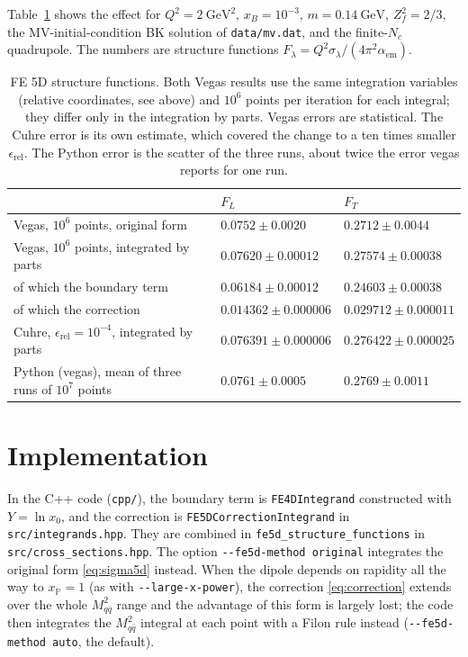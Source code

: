 \documentclass[11pt,a4paper]{article}
\newcommand{\Mqq}{M_{q\bar q}^2}
\newcommand{\xP}{x_{\mathbb{P}}}
\begin{document}
Table~\ref{tab:numbers} shows the effect for $Q^2 = 2\ \text{GeV}^2$,
$x_B = 10^{-3}$, $m = 0.14\ \text{GeV}$, $Z_f^2 = 2/3$, the MV-initial-condition
BK solution of \texttt{data/mv.dat}, and the finite-$N_c$ quadrupole. The
numbers are structure functions $F_\lambda = Q^2 \sigma_\lambda/(4\pi^2
\alpha_{\text{em}})$.
\begin{table}[h]
  \centering
  \small
  \begin{tabular}{lll}
    \toprule
    & $F_L$ & $F_T$ \\
    \midrule
    Vegas, $10^6$ points, original form          & $0.0752 \pm 0.0020$ & $0.2712 \pm 0.0044$ \\
    Vegas, $10^6$ points, integrated by parts    & $0.07620 \pm 0.00012$ & $0.27574 \pm 0.00038$ \\
    \quad of which the boundary term            & $0.06184 \pm 0.00012$ & $0.24603 \pm 0.00038$ \\
    \quad of which the correction               & $0.014362 \pm 0.000006$ & $0.029712 \pm 0.000011$ \\
    Cuhre, $\epsilon_{\text{rel}} = 10^{-4}$, integrated by parts & $0.076391 \pm 0.000006$ & $0.276422 \pm 0.000025$ \\
    Python (vegas), mean of three runs of $10^7$ points & $0.0761 \pm 0.0005$ & $0.2769 \pm 0.0011$ \\
    \bottomrule
  \end{tabular}
  \caption{FE 5D structure functions. Both Vegas results use the same
    integration variables (relative coordinates, see above) and $10^6$ points
    per iteration for each integral; they differ only in the integration by
    parts. Vegas errors are statistical. The Cuhre
    error is its own estimate, which covered the change to a ten times smaller
    $\epsilon_{\text{rel}}$. The Python error is the scatter of the three runs,
    about twice the error vegas reports for one run.}
  \label{tab:numbers}
\end{table}

\section{Implementation}

In the C++ code (\texttt{cpp/}), the boundary term is \texttt{FE4DIntegrand}
constructed with $Y = \ln x_0$, and the correction is
\texttt{FE5DCorrectionIntegrand} in \texttt{src/integrands.hpp}. They are
combined in \texttt{fe5d\_structure\_functions} in
\texttt{src/cross\_sections.hpp}. The option \texttt{-{}-fe5d-method original}
integrates the original form \eqref{eq:sigma5d} instead. When the dipole depends
on rapidity all the way to $\xP = 1$ (as with \texttt{-{}-large-x-power}), the
correction \eqref{eq:correction} extends over the whole $\Mqq$ range and the
advantage of this form is largely lost; the code then integrates the $\Mqq$
integral at each point with a Filon rule instead (\texttt{-{}-fe5d-method auto},
the default).
\end{document}

